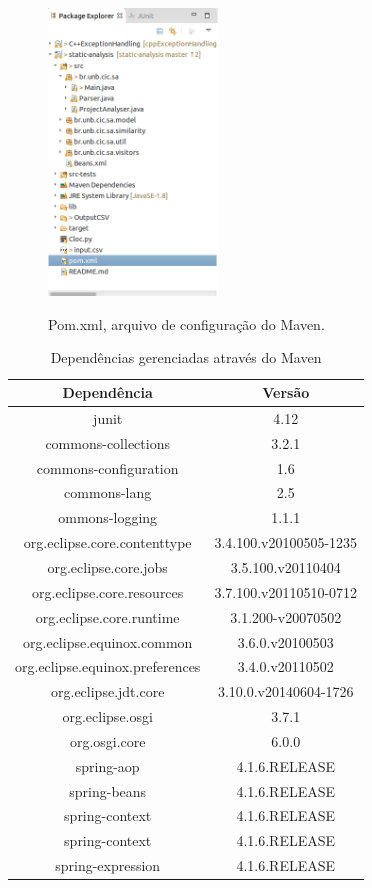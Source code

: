 \begin{figure}[h]
	\center
	\includegraphics[width=0.4\textwidth]{Imagens/PomMaven}
	\label{fig:pomMaven}
	\caption{Pom.xml, arquivo de configuração do Maven.}
\end{figure}

\begin{table}[ht]
	\centering
	\caption{Dependências gerenciadas através do Maven}
		\begin{tabular}{c|c}%
			\hline \hline
			\textbf{Dependência}    &   \textbf{Versão}\\ \hline
			junit 			    	&	4.12 \\ \hline
			commons-collections 	&	3.2.1 \\ \hline
			commons-configuration 	&	1.6 \\ \hline
			commons-lang 	    	&	2.5 \\ \hline
			ommons-logging 			&	1.1.1 \\ \hline
			org.eclipse.core.contenttype & 3.4.100.v20100505-1235 \\ \hline
			org.eclipse.core.jobs 		&	3.5.100.v20110404 \\ \hline
			org.eclipse.core.resources  &	3.7.100.v20110510-0712 \\ \hline
			org.eclipse.core.runtime		&	3.1.200-v20070502 \\ \hline
			org.eclipse.equinox.common		&	3.6.0.v20100503 \\ \hline
			org.eclipse.equinox.preferences &	3.4.0.v20110502 \\ \hline
			org.eclipse.jdt.core 			&	3.10.0.v20140604-1726 \\ \hline
			org.eclipse.osgi 	&	3.7.1 \\ \hline
			org.osgi.core 		&	6.0.0 \\ \hline
			spring-aop 	    	&	4.1.6.RELEASE \\ \hline
			spring-beans 		&	4.1.6.RELEASE \\ \hline
			spring-context 		&	4.1.6.RELEASE \\ \hline
			spring-context 		&	4.1.6.RELEASE \\ \hline 		
			spring-expression 	&	4.1.6.RELEASE \\ \hline
		\end{tabular}
	
\end{table}



